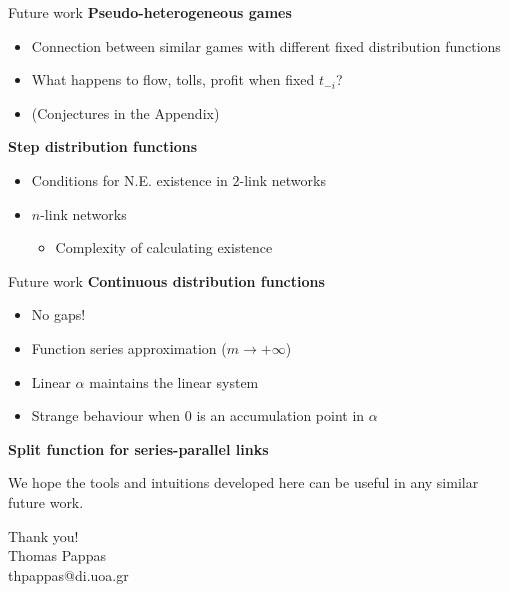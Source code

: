 \documentclass{beamer}
\begin{document}
\begin{frame}{Future work}
	\textbf{Pseudo-heterogeneous games}
	\begin{itemize}
		\item Connection between similar games with different fixed distribution functions
		\item What happens to flow, tolls, profit when fixed $t_{-i}$?
		\item (Conjectures in the Appendix)
	\end{itemize}

	\textbf{Step distribution functions}
	\begin{itemize}
		\item Conditions for N.E. existence in $2$-link networks
		\item $n$-link networks
		\begin{itemize}
			\item Complexity of calculating existence
		\end{itemize}
	\end{itemize}
\end{frame}

\begin{frame}{Future work}
	\textbf{Continuous distribution functions}
	\begin{itemize}
		\item No gaps!
		\item Function series approximation ($m \rightarrow +\infty$)
		\item Linear $\alpha$ maintains the linear system
		\item Strange behaviour when $0$ is an accumulation point in $\alpha$
	\end{itemize}

	\textbf{Split function for series-parallel links}

	We hope the tools and intuitions developed here can be useful in any similar future work.
\end{frame}

\begin{frame}{}
	\centering
    \huge Thank you!\\
    \normalsize Thomas Pappas\\
    thpappas@di.uoa.gr
\end{frame}
\end{document}
